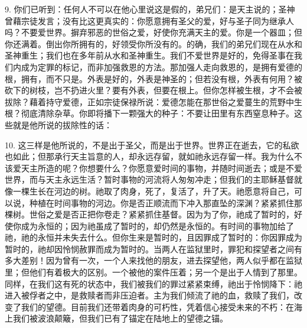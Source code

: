 9. 你们已听到：任何人不可以在他心里说这是假的，弟兄们：是天主说的；圣神曾藉宗徒发言；没有比这更真实的：你愿意拥有圣父的爱，好与圣子同为继承人吗？不要爱世界。摒弃邪恶的世俗之爱，好使你充满天主的爱。你是一个器皿；但你还满着。倒出你所拥有的，好领受你所没有的。的确，我们的弟兄们现在从水和圣神重生；我们也在多年前从水和圣神重生。我们不爱世界是好的，免得圣事在我们内成为定罪的标记，而非加强救恩的方法。那加强人走向救恩的，是拥有爱德的根，拥有，而不只是。外表是好的，外表是神圣的；但若没有根，外表有何用？被砍下的树枝，岂不扔进火里？要有外表，但要在根上。但你怎样被生根，才不会被拔除？藉着持守爱德，正如宗徒保禄所说：爱德怎能在那世俗之爱蔓生的荒野中生根？彻底清除杂草。你即将播下一颗强大的种子：不要让田里有东西窒息种子。这些就是他所说的拔除性的话：\par

10. 这三样是他所说的，不是出于圣父，而是出于世界。世界正在逝去，它的私欲也如此；但那承行天主旨意的人，却永远存留，就如祂永远存留一样。我为什么不该爱天主所造的呢？你想要什么？你愿意爱时间的事物，并随时间逝去；或是不爱世界，而与天主永远生活？暂时事物的河流将人匆匆冲走；但我们的主耶稣基督就像一棵生长在河边的树。祂取了肉身，死了，复活了，升了天。祂愿意将自己，可以说，种植在时间事物的河边。你是否正顺流而下冲入那直坠的深渊？紧紧抓住那棵树。世俗之爱是否正把你卷走？紧紧抓住基督。因为为了你，祂成了暂时的，好使你成为永恒的；因为祂虽成了暂时的，却仍然是永恒的。有时间的事物加给了祂，祂的永恒并未失去什么。但你生来是暂时的，且因罪成了暂时的：你因罪成为暂时的，祂却因怜悯赦罪而成为暂时的。当两人在监狱里时，罪犯和探望者之间有多大差别！因为曾有一次，一个人来找他的朋友，进去探望他，两人似乎都在监狱里；但他们有着极大的区别。一个被他的案件压着；另一个是出于人情到了那里。同样，在我们这有死的状态中，我们被我们的罪过紧紧束缚，祂出于怜悯降下：祂进入被俘者之中，是救赎者而非压迫者。主为我们倾流了祂的血，救赎了我们，改变了我们的望德。目前我们还带着肉身的可朽性，凭着信心接受未来的不朽：在海上我们被波浪颠簸，但我们已有了锚定在陆地上的望德之锚。\par

